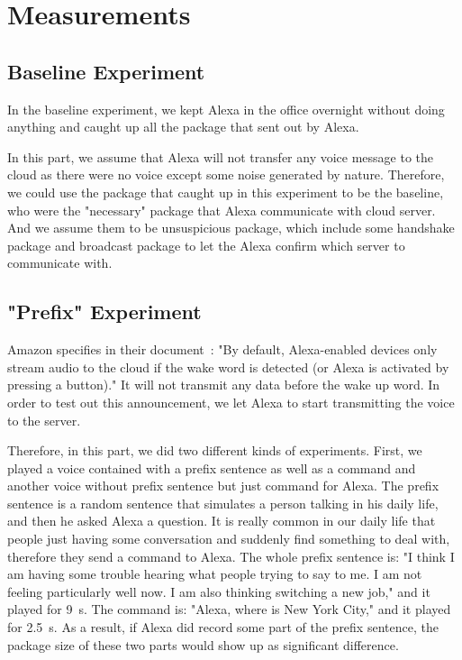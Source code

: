 \section{Measurements}

\subsection{Baseline Experiment}

In the baseline experiment, we kept Alexa in the office overnight without doing anything and caught up all the package that sent out by Alexa.

In this part, we assume that Alexa will not transfer any voice message to the cloud as there were no voice except some noise generated by nature. Therefore, we could use the package that caught up in this experiment to be the baseline, who were the "necessary" package that Alexa communicate with cloud server. And we assume them to be unsuspicious package, which include some handshake package and broadcast package to let the Alexa confirm which server to communicate with.






\subsection{"Prefix" Experiment}

Amazon specifies in their document~\cite{Alexadocument}: "By default, Alexa-enabled devices only stream audio to the cloud if the wake word is detected (or Alexa is activated by pressing a button)." It will not transmit any data before the wake up word. In order to test out this announcement, we let Alexa to start transmitting the voice to the server. 

Therefore, in this part, we did two different kinds of experiments. First, we played a voice contained with a prefix sentence as well as a command and another voice without prefix sentence but just command for Alexa. The prefix sentence is a random sentence that simulates a person talking in his daily life, and then he asked Alexa a question. It is really common in our daily life that people just having some conversation and suddenly find something to deal with, therefore they send a command to Alexa. The whole prefix sentence is: "I think I am having some trouble hearing what people trying to say to me. I am not feeling particularly well now. I am also thinking switching a new job," and it played for 9~s. The command is: "Alexa, where is New York City," and it played for 2.5~s. As a result, if Alexa did record some part of the prefix sentence, the package size of these two parts would show up as significant difference.

